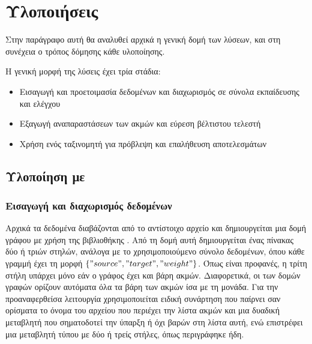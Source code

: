 \section{Υλοποιήσεις}

Στην παράγραφο αυτή θα αναλυθεί αρχικά η γενική δομή των λύσεων, και στη συνέχεια 
ο τρόπος δόμησης κάθε υλοποίησης.

Η γενική μορφή της λύσεις έχει τρία στάδια:

\begin{itemize}
    \item Εισαγωγή και προετοιμασία δεδομένων και διαχωρισμός σε σύνολα εκπαίδευσης και ελέγχου
    \item Εξαγωγή αναπαραστάσεων των ακμών και εύρεση βέλτιστου τελεστή
    \item Χρήση ενός ταξινομητή για πρόβλεψη και επαλήθευση αποτελεσμάτων
\end{itemize}


\subsection{Υλοποίηση με }

\subsubsection{Εισαγωγή και διαχωρισμός δεδομένων} \label{n2v_data}

Αρχικά τα δεδομένα διαβάζονται από το αντίστοιχο αρχείο και δημιουργείται μια δομή γράφου με
χρήση της βιβλιοθήκης  \cite{Networkx}. Από τη δομή αυτή δημιουργείται ένας
πίνακας δύο ή τριών στηλών, ανάλογα με το χρησιμοποιούμενο σύνολο δεδομένων, όπου κάθε γραμμή έχει τη μορφή \(\{"source", "target", "weight"\}\).
Όπως είναι προφανές, η τρίτη στήλη υπάρχει μόνο εάν ο γράφος έχει και βάρη ακμών. Διαφορετικά,
οι  των δομών γραφών ορίζουν αυτόματα όλα τα βάρη των ακμών ίσα με τη μονάδα.
Για την προαναφερθείσα λειτουργία χρησιμοποιείται ειδική συνάρτηση που παίρνει σαν ορίσματα
το όνομα του αρχείου που περιέχει την λίστα ακμών και μια δυαδική μεταβλητή που σηματοδοτεί
την ύπαρξη ή όχι βαρών στη λίστα αυτή, ενώ επιστρέφει μια μεταβλητή τύπου 
\cite{mckinney-proc-scipy-2010} με δύο ή τρείς στήλες, όπως περιγράφηκε ήδη.

